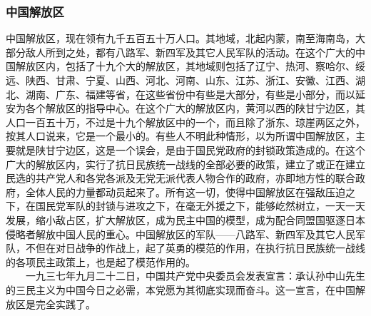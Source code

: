 \documentclass[cn,11pt,chinese]{elegantbook}
\def\myformat#1{\hfil\hfil #1}
\begin{document}
\subsubsection*{\myformat{中国解放区}}
中国解放区，现在领有九千五百五十万人口。其地域，北起内蒙，南至海南岛，大部分敌人所到之处，都有八路军、新四军及其它人民军队的活动。在这个广大的中国解放区内，包括了十九个大的解放区，其地域则包括了辽宁、热河、察哈尔、绥远、陕西、甘肃、宁夏、山西、河北、河南、山东、江苏、浙江、安徽、江西、湖北、湖南、广东、福建等省，在这些省份中有些是大部分，有些是小部分，而以延安为各个解放区的指导中心。在这个广大的解放区内，黄河以西的陕甘宁边区，其人口一百五十万，不过是十九个解放区中的一个，而且除了浙东、琼崖两区之外，按其人口说来，它是一个最小的。有些人不明此种情形，以为所谓中国解放区，主要就是陕甘宁边区，这是一个误会，是由于国民党政府的封锁政策造成的。在这个广大的解放区内，实行了抗日民族统一战线的全部必要的政策，建立了或正在建立民选的共产党人和各党各派及无党无派代表人物合作的政府，亦即地方性的联合政府，全体人民的力量都动员起来了。所有这一切，使得中国解放区在强敌压迫之下，在国民党军队的封锁与进攻之下，在毫无外援之下，能够屹然树立，一天一天发展，缩小敌占区，扩大解放区，成为民主中国的模型，成为配合同盟国驱逐日本侵略者解放中国人民的重心。中国解放区的军队——八路军、新四军及其它人民军队，不但在对日战争的作战上，起了英勇的模范的作用，在执行抗日民族统一战线的各项民主政策上，也是起了模范作用的。\\
　　一九三七年九月二十二日，中国共产党中央委员会发表宣言：承认孙中山先生的三民主义为中国今日之必需，本党愿为其彻底实现而奋斗。这一宣言，在中国解放区是完全实践了。\\
\end{document}
